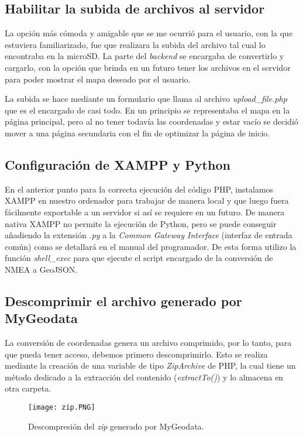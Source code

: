 \subsection{Habilitar la subida de archivos al servidor}
La opción más cómoda y amigable que se me ocurrió para el usuario, con la que estuviera familiarizado, fue que realizara la subida del archivo tal cual lo encontraba en la microSD. La parte del \textit{backend} se encargaba de convertirlo y cargarlo, con la opción que brinda en un futuro tener los archivos en el servidor para poder mostrar el mapa deseado por el usuario.
 
La subida se hace mediante un formulario que llama al archivo \textit{upload\_file.php} que es el encargado de casi todo. En un principio se representaba el mapa en la página principal, pero al no tener todavía las coordenadas y estar vacío se decidió mover a una página secundaria con el fin de optimizar la página de inicio.

\subsection{Configuración de XAMPP y Python} 
En el anterior punto para la correcta ejecución del código PHP, instalamos XAMPP en nuestro ordenador para trabajar de manera local y que luego fuera fácilmente exportable a un servidor si así se requiere en un futuro. De manera nativa XAMPP no permite la ejecución de Python, pero se puede conseguir añadiendo la extensión \textit{.py} a la \textit{Common Gateway Interface} (interfaz de entrada común) como se detallará en el manual del programador.
De esta forma utilizo la función \textit{shell\_exec} para que ejecute el script encargado de la conversión de NMEA a GeoJSON.

\subsection{Descomprimir el archivo generado por MyGeodata}
La conversión de coordenadas genera un archivo comprimido, por lo tanto, para que pueda tener acceso, debemos primero descomprimirlo. Esto se realiza mediante la creación de una variable de tipo \textit{ZipArchive} de PHP, la cual tiene un método dedicado a la extracción del contenido (\textit{extractTo()}) y lo almacena en otra carpeta.
\begin{figure}[!h]
	\centering
	\texttt{[image: zip.PNG]}
	\caption{Descompresión del \textit{zip} generado por MyGeodata.}\label{fig:zip.PNG}
\end{figure}
\FloatBarrier

